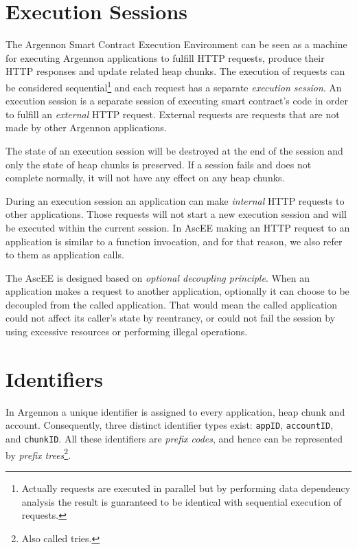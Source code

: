 \section{Execution Sessions}\label{sec:sessions}

The Argennon Smart Contract Execution Environment can be seen as a machine for executing Argennon applications to
fulfill HTTP requests, produce their HTTP responses and update related heap chunks. The execution of requests can be
considered sequential\footnote{Actually requests are executed in parallel but by performing data dependency analysis the
result is guaranteed to be identical
with sequential execution of requests.} and each request has a separate \emph{execution session}. An execution session
is a separate session of executing smart contract's code in order to fulfill an \emph{external} HTTP request.
External requests are requests that are not made by other Argennon applications.

The state of an execution session will be
destroyed at the end of the session and only the state of heap chunks is preserved. If a session fails and does not
complete normally, it will not have any effect on any heap chunks.

During an execution session an application can make \emph{internal} HTTP requests to other applications. Those
requests will not start a new execution session and will be executed within the current session. In AscEE making an
HTTP request to an application is similar to a function invocation, and for that reason, we also refer to them as
application calls.

The AscEE is designed based on \emph{optional decoupling principle}. When an application makes a request to another
application, optionally it can choose to be decoupled from the called application. That would mean the called
application could not affect its caller's state by reentrancy, or could not fail the session by using excessive
resources or performing illegal operations.


\section{Identifiers}\label{sec:identifiers}

In Argennon a unique identifier is assigned to every application, heap chunk and account. Consequently, three distinct
identifier types exist: \texttt{appID}, \texttt{accountID}, and \texttt{chunkID}.
All these identifiers are \emph{prefix codes}, and hence can be represented by
\emph{prefix trees}\footnote{Also called tries.}.

